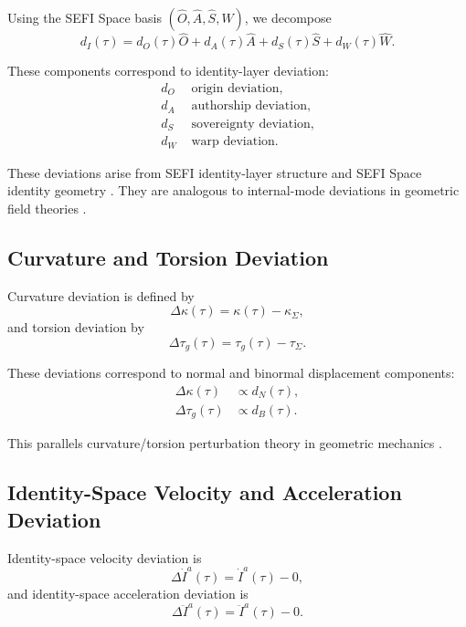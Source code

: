 \documentclass[aip,jmp,reprint,onecolumn,nofootinbib]{revtex4-2}
\begin{document}
Using the SEFI Space basis $(\hat{O},\hat{A},\hat{S},\hat{W})$, we decompose
\begin{equation}
d_I(\tau)
=
d_O(\tau)\hat{O}
+
d_A(\tau)\hat{A}
+
d_S(\tau)\hat{S}
+
d_W(\tau)\hat{W}.
\end{equation}

These components correspond to identity-layer deviation:
\begin{align}
d_O &\text{ origin deviation}, \\
d_A &\text{ authorship deviation}, \\
d_S &\text{ sovereignty deviation}, \\
d_W &\text{ warp deviation}.
\end{align}

These deviations arise from SEFI identity-layer structure \cite{DuttonSEFI2026} and SEFI 
Space identity geometry \cite{DuttonSEFISpace2026}. They are analogous to internal-mode 
deviations in geometric field theories \cite{Nakahara,Frankel}.

\subsection{Curvature and Torsion Deviation}

Curvature deviation is defined by
\begin{equation}
\Delta\kappa(\tau)
=
\kappa(\tau) - \kappa_\Sigma,
\end{equation}
and torsion deviation by
\begin{equation}
\Delta\tau_g(\tau)
=
\tau_g(\tau) - \tau_\Sigma.
\end{equation}

These deviations correspond to normal and binormal displacement components:
\begin{align}
\Delta\kappa(\tau) &\propto d_N(\tau), \\
\Delta\tau_g(\tau) &\propto d_B(\tau).
\end{align}

This parallels curvature/torsion perturbation theory in geometric mechanics 
\cite{ArnoldMechanics}.

\subsection{Identity-Space Velocity and Acceleration Deviation}

Identity-space velocity deviation is
\begin{equation}
\Delta\dot{I}^a(\tau)
=
\dot{I}^a(\tau) - 0,
\end{equation}
and identity-space acceleration deviation is
\begin{equation}
\Delta\ddot{I}^a(\tau)
=
\ddot{I}^a(\tau) - 0.
\end{equation}
\end{document}
